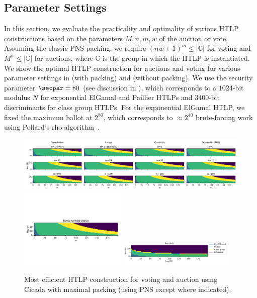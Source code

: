 \subsection{Parameter Settings}

In this section, we evaluate the practicality and optimality of various HTLP constructions based on the parameters $M,n,m,w$ of the auction or vote. 
Assuming the classic PNS packing, we require $(nw+1)^m\leq\vert\mathbb{G}\vert$ for voting and $M^n\leq\vert\mathbb{G}\vert$ for auctions, where $\mathbb{G}$ is the group in which the HTLP is instantiated.
We show the optimal HTLP construction for auctions and voting for various parameter settings in  (with packing) and  (without packing). We use the security parameter $\secpar=80$ (see discussion in ), which corresponds to a $1024$-bit modulus $N$ for exponential ElGamal and Paillier HTLPs and $3400$-bit discriminants for class group HTLPs. For the exponential ElGamal HTLP, we fixed the maximum ballot at $2^{80}$, which corresponds to $\approx 2^{40}$ brute-forcing work using Pollard's rho algorithm~\cite{Pollard78}.

\begin{figure}[tb!]
    \centering
    \includegraphics[width=\textwidth]{cicada/figs/params/pack_crq.pdf}
    \centering  \includegraphics[width=0.45\textwidth,trim={0cm 3cm 0cm 4.5cm},clip]{cicada/figs/params/pack_borda.pdf}  \includegraphics[width=0.5\textwidth,trim={0cm -1cm 0cm 4.5cm}]{cicada/figs/params/pack_auction.pdf}
    \caption{Most efficient HTLP construction for voting and auction using Cicada with maximal packing (using PNS except where indicated).}
    \label{fig:packed_feasibility}
\end{figure}


